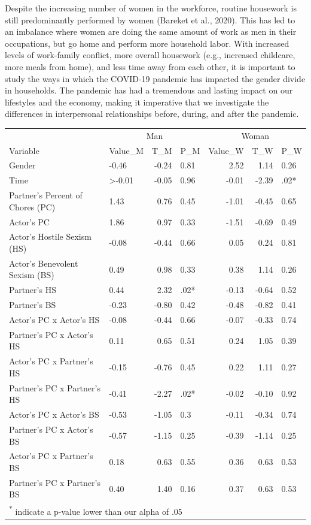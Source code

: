 \documentclass[
  man]{apa6}
\begin{document}
Despite the increasing number of women in the workforce, routine housework is still predominantly performed by women (Bareket et al., 2020). This has led to an imbalance where women are doing the same amount of work as men in their occupations, but go home and perform more household labor. With increased levels of work-family conflict, more overall housework (e.g., increased childcare, more meals from home), and less time away from each other, it is important to study the ways in which the COVID-19 pandemic has impacted the gender divide in households. The pandemic has had a tremendous and lasting impact on our lifestyles and the economy, making it imperative that we investigate the differences in interpersonal relationships before, during, and after the pandemic.

\begin{tabular}{l|l|r|l|r|r|l}
\hline
\multicolumn{1}{c|}{ } & \multicolumn{3}{c|}{Man} & \multicolumn{3}{c}{Woman} \\
\cline{2-4} \cline{5-7}
Variable & Value\_M & T\_M & P\_M & Value\_W & T\_W & P\_W\\
\hline
Gender & -0.46 & -0.24 & 0.81 & 2.52 & 1.14 & 0.26\\
\hline
Time & >-0.01 & -0.05 & 0.96 & -0.01 & -2.39 & .02*\\
\hline
Partner's Percent of Chores (PC) & 1.43 & 0.76 & 0.45 & -1.01 & -0.45 & 0.65\\
\hline
Actor's PC & 1.86 & 0.97 & 0.33 & -1.51 & -0.69 & 0.49\\
\hline
Actor's Hostile Sexism (HS) & -0.08 & -0.44 & 0.66 & 0.05 & 0.24 & 0.81\\
\hline
Actor's Benevolent Sexism (BS) & 0.49 & 0.98 & 0.33 & 0.38 & 1.14 & 0.26\\
\hline
Partner's HS & 0.44 & 2.32 & .02* & -0.13 & -0.64 & 0.52\\
\hline
Partner's BS & -0.23 & -0.80 & 0.42 & -0.48 & -0.82 & 0.41\\
\hline
Actor's PC x Actor's HS & -0.08 & -0.44 & 0.66 & -0.07 & -0.33 & 0.74\\
\hline
Partner's PC x Actor's HS & 0.11 & 0.65 & 0.51 & 0.24 & 1.05 & 0.39\\
\hline
Actor's PC x Partner's HS & -0.15 & -0.76 & 0.45 & 0.22 & 1.11 & 0.27\\
\hline
Partner's PC x Partner's HS & -0.41 & -2.27 & .02* & -0.02 & -0.10 & 0.92\\
\hline
Actor's PC x Actor's BS & -0.53 & -1.05 & 0.3 & -0.11 & -0.34 & 0.74\\
\hline
Partner's PC x Actor's BS & -0.57 & -1.15 & 0.25 & -0.39 & -1.14 & 0.25\\
\hline
Actor's PC x Partner's BS & 0.18 & 0.63 & 0.55 & 0.36 & 0.63 & 0.53\\
\hline
Partner's PC x Partner's BS & 0.40 & 1.40 & 0.16 & 0.37 & 0.63 & 0.53\\
\hline
\multicolumn{7}{l}{\textsuperscript{*} indicate a p-value lower than our alpha of .05}\\
\end{tabular}
\end{document}
